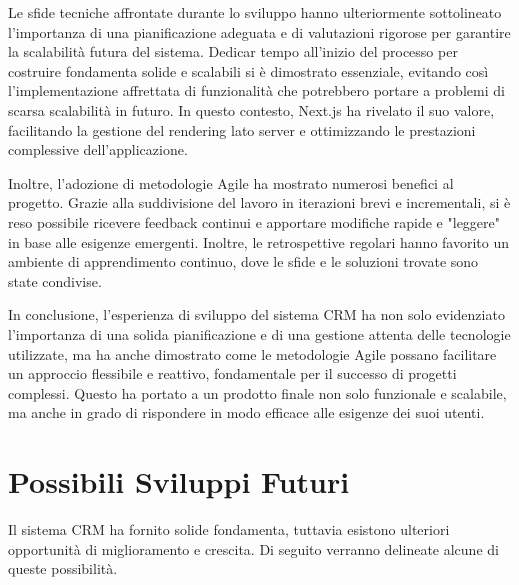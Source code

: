 \documentclass[target=bach,aauheader=,style=]{thud}
\begin{document}
\noindent Le sfide tecniche affrontate durante lo sviluppo hanno ulteriormente sottolineato l'importanza di una pianificazione adeguata e di valutazioni rigorose per garantire la scalabilità futura del sistema. Dedicar tempo all'inizio del processo per costruire fondamenta solide e scalabili si è dimostrato essenziale, evitando così l'implementazione affrettata di funzionalità che potrebbero portare a problemi di scarsa scalabilità in futuro. In questo contesto, Next.js ha rivelato il suo valore, facilitando la gestione del rendering lato server e ottimizzando le prestazioni complessive dell'applicazione.

\noindent Inoltre, l'adozione di metodologie Agile ha mostrato numerosi benefici al progetto. Grazie alla suddivisione del lavoro in iterazioni brevi e incrementali, si è reso possibile ricevere feedback continui e apportare modifiche rapide e "leggere" in base alle esigenze emergenti. Inoltre, le retrospettive regolari hanno favorito un ambiente di apprendimento continuo, dove le sfide e le soluzioni trovate sono state condivise.

\noindent In conclusione, l'esperienza di sviluppo del sistema CRM ha non solo evidenziato l'importanza di una solida pianificazione e di una gestione attenta delle tecnologie utilizzate, ma ha anche dimostrato come le metodologie Agile possano facilitare un approccio flessibile e reattivo, fondamentale per il successo di progetti complessi. Questo ha portato a un prodotto finale non solo funzionale e scalabile, ma anche in grado di rispondere in modo efficace alle esigenze dei suoi utenti.

\section{Possibili Sviluppi Futuri}
Il sistema CRM ha fornito solide fondamenta, tuttavia esistono ulteriori opportunità di miglioramento e crescita. Di seguito verranno delineate alcune di queste possibilità.
\end{document}
